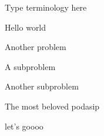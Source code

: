 \documentclass[11pt]{rosspset}
\begin{document}
\maketitle

\begin{terminology}
    \item Type terminology here
\end{terminology}

\numerical

\begin{problem}
    Hello world
\end{problem}

\exploration

\begin{problem}
    Another problem
    \begin{subproblem}
        \item A subproblem
        \item Another subproblem
    \end{subproblem}
\end{problem}

\podasip

\begin{problem}
    The most beloved podasip
\end{problem}


\begin{problem}
    let's goooo
\end{problem}
\end{document}
